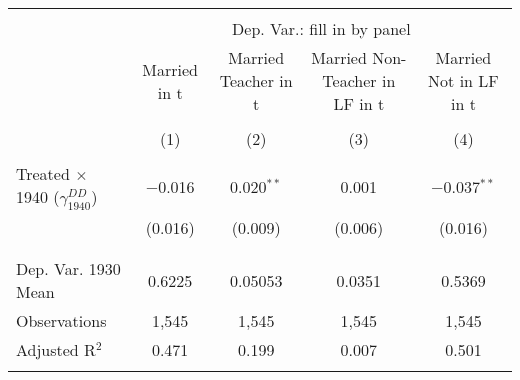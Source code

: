 
\begin{tabular}{@{\extracolsep{5pt}}lcccc} 
\\[-1.8ex]\hline 
\hline \\[-1.8ex] 
 & \multicolumn{4}{c}{Dep. Var.: fill in by panel} \\ 
\cline{2-5} 
 & Married in t & Married Teacher in t & Married Non-Teacher in LF in t & Married Not in LF in t \\ 
\\[-1.8ex] & (1) & (2) & (3) & (4)\\ 
\hline \\[-1.8ex] 
 Treated $\times$ 1940 ($\gamma_{1940}^{DD}$) & $-$0.016 & 0.020$^{**}$ & 0.001 & $-$0.037$^{**}$ \\ 
  & (0.016) & (0.009) & (0.006) & (0.016) \\ 
  & & & & \\ 
\hline \\[-1.8ex] 
Dep. Var. 1930 Mean & 0.6225 & 0.05053 & 0.0351 & 0.5369 \\ 
Observations & 1,545 & 1,545 & 1,545 & 1,545 \\ 
Adjusted R$^{2}$ & 0.471 & 0.199 & 0.007 & 0.501 \\ 
\hline 
\hline \\[-1.8ex] 
\end{tabular} 
